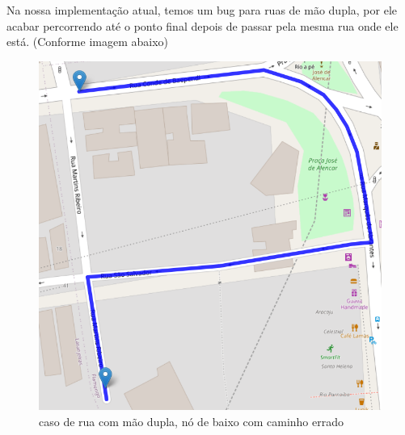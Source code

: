 \documentclass{article}
\begin{document}
Na nossa implementação atual, temos um bug para ruas de mão dupla, por ele acabar percorrendo até o ponto final depois de passar pela mesma rua onde ele está. (Conforme imagem abaixo)

\begin{figure}[H]
    \centering
    \includegraphics[scale=0.5]{EDA_two_way_street_bug.png}
    \caption{caso de rua com mão dupla, nó de baixo com caminho errado}
    \label{fig7}
\end{figure}
\end{document}
